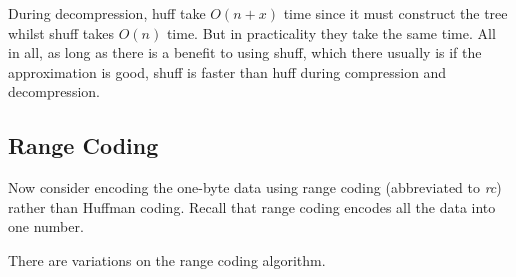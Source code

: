 During decompression, huff take $O(n + x)$ time since it must construct the tree
whilst shuff takes $O(n)$ time. But in practicality they take the same time. All
in all, as long as there is a benefit to using shuff, which there usually is if
the approximation is good, shuff is faster than huff during compression and
decompression.



\subsection{Range Coding}

Now consider encoding the one-byte data using range coding (abbreviated to
\textit{rc}) rather than Huffman coding. Recall that range coding encodes all
the data into one number.

There are variations on the range coding algorithm.
